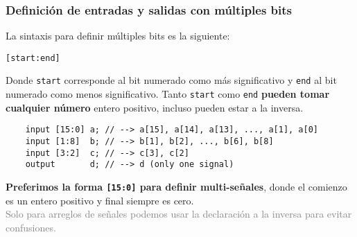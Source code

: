\documentclass[aspectratio=169]{beamer}
\begin{document}
\begin{frame}[fragile,t]
    \frametitle{Definición de entradas y salidas con múltiples bits}
    La sintaxis para definir múltiples bits es la siguiente:
    \begin{center}
    \verb|[start:end]|
    \end{center}
    Donde \texttt{start} corresponde al bit numerado como más significativo y \texttt{end} al bit numerado como menos significativo.
    \textcolor{verdeuca}{Tanto \texttt{start} como \texttt{end} \textbf{pueden tomar cualquier número} entero positivo, incluso pueden estar a la inversa.}
    \pause
    \vspace{0.3cm}
\begin{lstlisting}
    input [15:0] a; // --> a[15], a[14], a[13], ..., a[1], a[0]
    input [1:8]  b; // --> b[1], b[2], ..., b[6], b[8]
    input [3:2]  c; // --> c[3], c[2]
    output       d; // --> d (only one signal)
\end{lstlisting}
    \vspace{0.3cm}
    \pause
    \textcolor{verdeuca}{\textbf{Preferimos la forma \texttt{[15:0]} para definir multi-señales}},
    donde el comienzo es un entero positivo y final siempre es cero.\\
    \textcolor{gray}{Solo para arreglos de señales podemos usar la declaración a la inversa para evitar confusiones.}
\end{frame}
\end{document}
